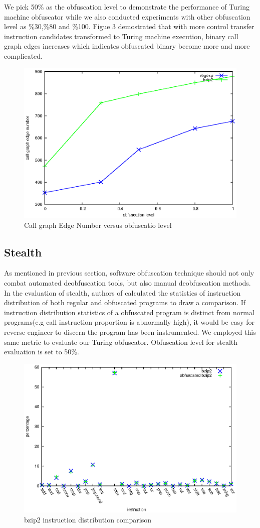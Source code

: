 \documentclass[lnicst]{svmultln}
\begin{document}
We pick 50\% as the obfuscation level to demonstrate the performance of Turing machine obfuscator while we also conducted experiments with other obfuscation level as \%30,\%80 and \%100. Figue 3 demostrated that with more control transfer instruction candidates transformed to Turing machine execution, binary call graph edges increases which indicates obfuscated binary become more and more complicated. 
\begin{figure}
  \includegraphics[width=0.9\linewidth]{cg.eps}
  \caption{Call graph Edge Number versus obfuscatio level}
  \label{Figure 3}
\end{figure}
\subsection{Stealth}
As mentioned in previous section, software obfuscation technique should not only combat automated deobfuscation tools, but also manual deobfuscation methods. In the evaluation of stealth, authors of \cite{Trans} calculated the statistics of instruction distribution of both regular and obfuscated programs to draw a comparison. If instruction distribution statistics of a obfuscated program is distinct from normal programs(e.g call instruction proportion is abnormally high), it would be easy for reverse engineer to discern the program has been instrumented. We employed this same metric to evaluate our Turing obfuscator. Obfuscation level for stealth evaluation is set to 50\%.
\begin{figure}
  \includegraphics[width=0.9\linewidth]{st_bzip2.eps}
  \caption{bzip2 instruction distribution comparison}
  \label{Figure 4}
\end{figure}
\end{document}
